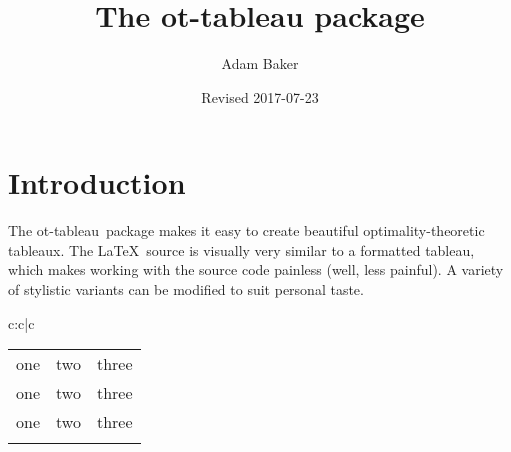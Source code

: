 \documentclass{article}
\title{The \textsf{ot-tableau} package}
\date{Revised 2017-07-23}
\author{Adam Baker}
\def\tabl{\textsf{ot-tableau}}
\begin{document}
\maketitle

\section{Introduction}
The \tabl\ package makes it easy to create beautiful optimality-theoretic tableaux. The \LaTeX\ source is visually very similar to a formatted tableau, which makes working with the source code painless (well, less painful). A variety of stylistic variants can be modified to suit personal taste.

\begin{center}
	\begin{tableau}{c:c|c}
	          
	             \vio{*!}         \vio{}            \vio{}
	    \vio{}           \vio{}            \vio{*}
	              \vio{}           \vio{*!}          \vio{}
	\end{tableau}
\end{center}

\begin{tabular}{|l||l|l|}
\hhline{-||--}
one & two & three \\
\hhline{:=::==:}
one & two & three \\
\hhline{-||--}
one & two & three \\
\hhline{-||--}
\end{tabular}
\end{document}
